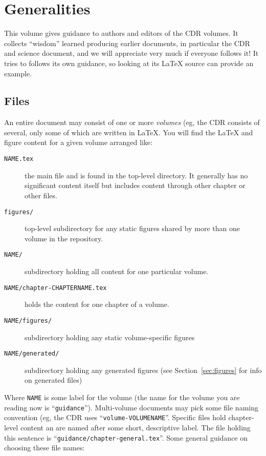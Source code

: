 \chapter{Generalities}
\label{ch:generalities}

This volume gives guidance to authors and editors of the CDR volumes. It collects ``wisdom'' learned 
producing earlier documents, in particular the CDR and science document, and we will appreciate 
very much if everyone follows it!  It tries to follows its own guidance, so looking at its \LaTeX{} source can 
provide an example.  
\section{Files}
\label{sec:files}

An entire document may consist of one or more \textit{volumes} (eg,
the CDR consists of several, only some of which are written in
\LaTeX{}.
You will find the \LaTeX{} and figure content for a given volume
arranged like:

\begin{description}
\item[\texttt{NAME.tex}] the main file and is found in the top-level
  directory. It generally has no significant content itself but
  includes content through other chapter or other files.
\item[\texttt{figures/}] top-level subdirectory for any static figures
  shared by more than one volume in the repository.
\item[\texttt{NAME/}] subdirectory holding all content for one particular volume.
\item[\texttt{NAME/chapter-CHAPTERNAME.tex}] holds the content for one
  chapter of a volume.
\item[\texttt{NAME/figures/}] subdirectory holding any static volume-specific figures
\item[\texttt{NAME/generated/}] subdirectory holding any generated
  figures (see Section~\ref{sec:figures} for info on generated files)
\end{description}

Where \texttt{NAME} is some label for the volume (the name for the
volume you are reading now is ``\texttt{guidance}'').
Multi-volume documents may pick some file naming convention (eg, the
CDR uses ``\texttt{volume-VOLUMENAME}''.
Specific files hold chapter-level content an are named after some
short, descriptive label.
The file holding this sentence is ``\texttt{guidance/chapter-general.tex}''.
Some general guidance on choosing these file names:

